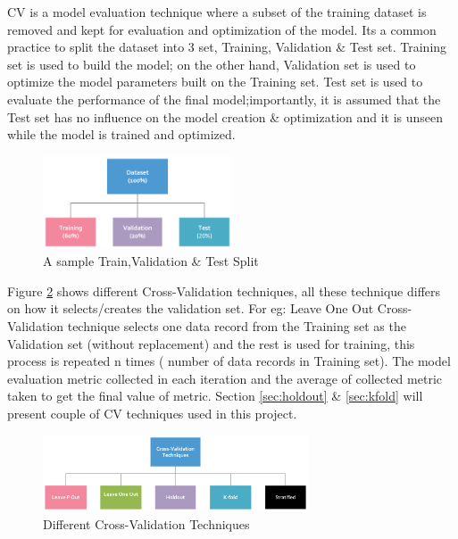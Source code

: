 \documentclass[twoside,11pt,a4paper]{article}
\begin{document}
\acf{CV} is a model evaluation technique where a subset of the training dataset is removed and kept for evaluation and optimization of the model. Its a common practice to split the dataset into 3 set, Training, Validation \& Test set. Training set is used to build the model; on the other hand, Validation set is used to optimize the model parameters built on the Training set. Test set is used to evaluate the performance of the final model;importantly, it is assumed that the Test set has no influence on the model creation \& optimization and it is unseen while the model is trained and optimized.\\
\begin{figure}[ht]
	\centering
	\includegraphics[width=0.5\textwidth]{dataset_split}
	\caption[A sample Train,Validation \& Test Split]{A sample Train,Validation \& Test Split}
	\label{fig:dataset_split}
\end{figure}
\FloatBarrier
Figure \ref{fig:cv_techniques} shows different Cross-Validation techniques, all these technique differs on how it selects/creates the validation set. For eg: Leave One Out Cross-Validation technique selects one data record from the Training set as the Validation set (without replacement) and the rest is used for training, this process is repeated n times ( number of data records in Training set). The model evaluation metric collected in each iteration and the average of collected metric taken to get the final value of metric. Section \ref{sec:holdout} \& \ref{sec:kfold} will present couple of \acs{CV} techniques used in this project.\\
\begin{figure}[ht]
	\centering
	\includegraphics[width=0.7\textwidth]{cv_techniques}
	\caption[Different Cross-Validation Techniques]{Different Cross-Validation Techniques}
	\label{fig:cv_techniques}
\end{figure}
\FloatBarrier
\end{document}
